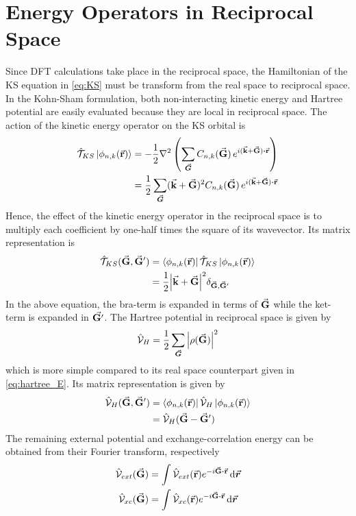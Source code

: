 \section{Energy Operators in Reciprocal Space}
Since DFT calculations take place in the reciprocal space, the Hamiltonian of  the KS equation in \eqref{eq:KS} must be transform from the real space to reciprocal space. In the Kohn-Sham formulation, both non-interacting kinetic energy and Hartree potential are easily evaluated because they are local in reciprocal space. The action of the  kinetic energy operator on the KS orbital  is
\begin{align}
	\hat{\mathcal{T}}_{KS} \ket{\phi_{n,k}(\va{r})} & = -\frac{1}{2} \laplacian \left( \sum_{\va*{G}} C_{n,k}(\va{G})\, e^{i (\va{k} + \va{G} ) \vdot \va{r}} \right) \\
	                                                & = \frac{1}{2} \sum_{\va*{G}} (\va{k} + \va{G} )^2 C_{n,k}(\va{G})\, e^{i (\va{k} + \va{G} ) \vdot \va{r}}
\end{align}
Hence, the effect of the kinetic energy operator in the reciprocal space is to multiply each coefficient by one-half times the square of its wavevector. Its matrix representation is
\begin{align}
	\hat{\mathcal{T}}_{KS}(\va{G},\va{G}') & = \bra{\phi_{n,k}(\va{r})} \hat{\mathcal{T}}_{KS} \ket{\phi_{n,k}(\va{r})} \\
	                                       & = \frac{1}{2} \abs{\va{k} + \va{G}}^2 \delta_{\va{G},\va{G}'}
\end{align}
In the above equation, the bra-term is expanded in terms  of $\va{G}$ while the ket-term is expanded in $\va{G'}$. The Hartree potential in reciprocal space is given by
\begin{equation}
	\hat{\mathcal{V}}_H = \frac{1}{2} \sum_{\va*{G}} \abs{\rho({\va{G}})}^2
\end{equation}
which is more simple compared to its real space counterpart given in \eqref{eq:hartree_E}. Its matrix representation is given by
\begin{align}
	\hat{\mathcal{V}}_H(\va{G},\va{G}') & = \bra{\phi_{n,k}(\va{r})} \hat{\mathcal{V}}_H  \ket{\phi_{n,k}(\va{r})} \\
	                                    & = \hat{\mathcal{V}}_H(\va{G} - \va{G}') \label{eq:hartree_rec}
\end{align}
The remaining external potential and exchange-correlation energy can be obtained from their  Fourier transform, respectively
\begin{align}
	\hat{\mathcal{V}}_{ext}(\va{G}) & = \int \hat{\mathcal{V}}_{ext}(\va{r}) e^{-i \va{G} \vdot \va{r}} \dd{\va*{r}} \\
	\hat{\mathcal{V}}_{xc}(\va{G})  & = \int \hat{\mathcal{V}}_{xc}(\va{r}) e^{-i \va{G} \vdot \va{r}} \dd{\va*{r}}
\end{align}
